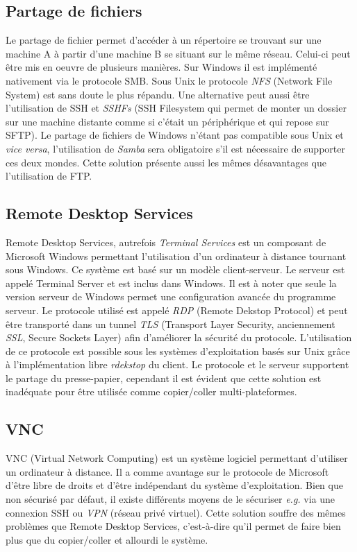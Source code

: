 \subsection{Partage de fichiers}
Le partage de fichier permet d'accéder à un répertoire se trouvant sur
une machine A à partir d'une machine B se situant sur le même réseau.
Celui-ci peut être mis en oeuvre de plusieurs manières. Sur Windows
il est implémenté nativement via le protocole SMB. Sous Unix le protocole
\emph{NFS} (Network File System) est sans doute le plus répandu.
Une alternative peut aussi être l'utilisation de SSH et \emph{SSHFs}
(SSH Filesystem qui permet de monter un dossier sur une machine distante
comme si c'était un périphérique et qui repose sur SFTP). Le partage de
fichiers de Windows n'étant pas compatible sous Unix et \emph{vice versa},
l'utilisation de \emph{Samba} \cite{samba} sera obligatoire s'il est nécessaire
de supporter ces deux mondes. Cette solution présente aussi les mêmes
désavantages que l'utilisation de FTP.

\subsection{Remote Desktop Services}
Remote Desktop Services, autrefois \emph{Terminal Services}
est un composant de Microsoft Windows permettant l'utilisation
d'un ordinateur à distance tournant sous Windows\cite{wiki:rds}.
Ce système est basé sur un modèle client-serveur.
Le serveur est appelé Terminal Server et est inclus dans Windows.
Il est à noter que seule la version serveur
de Windows permet une configuration avancée du programme serveur.
Le protocole utilisé est appelé \emph{RDP} (Remote Dekstop Protocol) et
peut être transporté dans un tunnel \emph{TLS} (Transport Layer Security,
anciennement \emph{SSL}, Secure Sockets Layer) afin d'améliorer la sécurité
du protocole. L'utilisation de ce protocole est possible sous les
systèmes d'exploitation basés sur Unix grâce à l'implémentation
libre \emph{rdekstop} \cite{rdesktop} du client. Le protocole et le serveur
supportent le partage du presse-papier, cependant il est évident que cette
solution est inadéquate pour être utilisée comme copier/coller
multi-plateformes.

\subsection{VNC}
VNC (Virtual Network Computing) \cite{wiki:vnc} est un système logiciel
permettant d'utiliser
un ordinateur à distance. Il a comme avantage sur le protocole de Microsoft
d'être libre de droits et d'être indépendant du système d'exploitation.
Bien que non sécurisé par défaut, il existe différents moyens de le sécuriser
\emph{e.g.} via une connexion SSH ou \emph{VPN} (réseau privé virtuel).
Cette solution souffre des mêmes problèmes que Remote Desktop Services,
c'est-à-dire qu'il permet de faire bien plus que du copier/coller et
allourdi le système.

